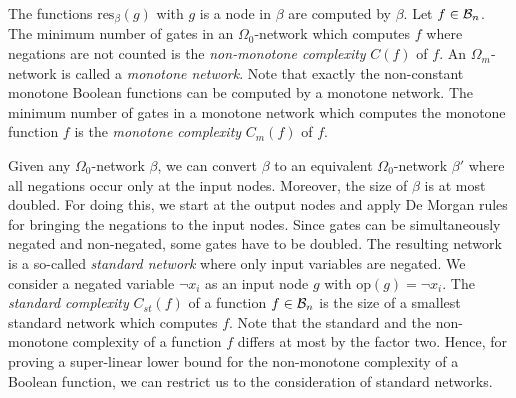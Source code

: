 \documentclass[11pt]{article}
\begin{document}
The functions $\mbox{res}_{\beta}(g)$ with $g$ is a node in $\beta$ are computed by $\beta$.
Let $f \in {\cal B}_n$. The minimum number of gates in an $\Omega_0$-network which computes $f$ where 
negations are not counted is the {\em non-monotone complexity\/} $C(f)$ of $f$. 
An $\Omega_m$-network is called a {\em monotone network}. Note that exactly the non-constant monotone
Boolean functions can be computed by a monotone network. The minimum number of gates in a 
monotone network which computes the monotone function $f$ is the {\em monotone complexity\/} 
$C_m(f)$ of $f$. 

Given any $\Omega_0$-network $\beta$, we can convert $\beta$ to an equivalent 
$\Omega_0$-network $\beta'$ where all negations occur only at the input nodes. Moreover,
the size of $\beta$ is at most doubled. For doing this, we start at the output 
nodes and apply De Morgan rules for bringing the negations to the input nodes. Since gates can
be simultaneously negated and non-negated, some gates have to be doubled. 
The resulting network is a so-called {\em standard network\/} where only input variables are negated.
We consider a negated variable $\neg x_i$ as an input node $g$ with $\mbox{op}(g) = \neg x_i$.
The {\em standard complexity\/} 
$C_{st}(f)$ of a function $f \in {\cal B}_n$ is the size of a smallest standard network which computes $f$.
Note that the standard and the non-monotone complexity of a function $f$ differs at most by the
factor two. Hence, for proving a super-linear lower bound for the non-monotone complexity of
a Boolean function, we can restrict us to the consideration of standard networks.
\end{document}
